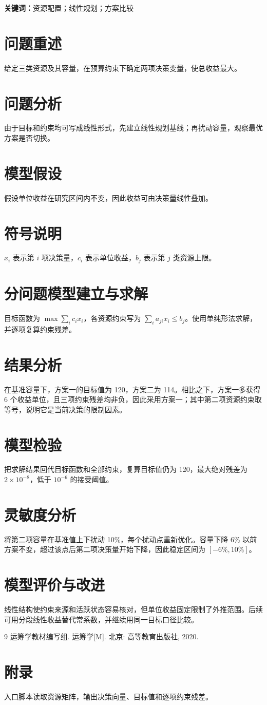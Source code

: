 \documentclass{ctexart}
\newcommand{\keywords}[1]{\par\noindent\textbf{关键词：}#1}
\begin{document}
\begin{abstract}
本文针对有限资源配置问题建立线性规划基线，并在相同约束下比较两种方案。模型给出可复算的目标值、约束余量和误差检验。
\end{abstract}
\keywords{资源配置；线性规划；方案比较}
\section{问题重述}
给定三类资源及其容量，在预算约束下确定两项决策变量，使总收益最大。
\section{问题分析}
由于目标和约束均可写成线性形式，先建立线性规划基线；再扰动容量，观察最优方案是否切换。
\section{模型假设}
假设单位收益在研究区间内不变，因此收益可由决策量线性叠加。
\section{符号说明}
$x_i$ 表示第 $i$ 项决策量，$c_i$ 表示单位收益，$b_j$ 表示第 $j$ 类资源上限。
\section{分问题模型建立与求解}
目标函数为 $\max \sum_i c_i x_i$，各资源约束写为 $\sum_i a_{ji}x_i\le b_j$。使用单纯形法求解，并逐项复算约束残差。
\section{结果分析}
在基准容量下，方案一的目标值为 120，方案二为 114。相比之下，方案一多获得 6 个收益单位，且三项约束残差均非负，因此采用方案一；其中第二项资源约束取等号，说明它是当前决策的限制因素。
\section{模型检验}
把求解结果回代目标函数和全部约束，复算目标值仍为 120，最大绝对残差为 $2\times10^{-8}$，低于 $10^{-6}$ 的接受阈值。
\section{灵敏度分析}
将第二项容量在基准值上下扰动 10\%，每个扰动点重新优化。容量下降 6\% 以前方案不变，超过该点后第二项决策量开始下降，因此稳定区间为 $[-6\%,10\%]$。
\section{模型评价与改进}
线性结构使约束来源和活跃状态容易核对，但单位收益固定限制了外推范围。后续可用分段线性收益替代常系数，并继续用同一目标口径比较。
\begin{thebibliography}{9}
 运筹学教材编写组. 运筹学[M]. 北京: 高等教育出版社, 2020.
\end{thebibliography}
\appendix
\section{附录}
入口脚本读取资源矩阵，输出决策向量、目标值和逐项约束残差。
\end{document}
